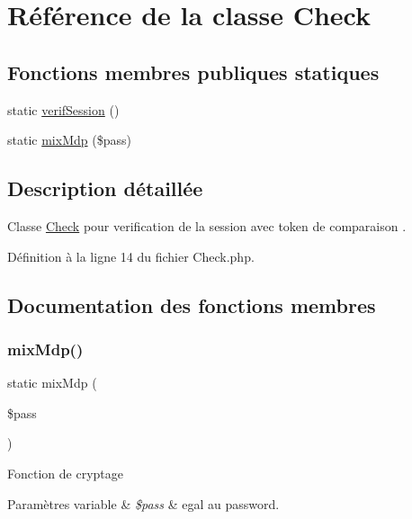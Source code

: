 \hypertarget{class_app_1_1_check}{}\section{Référence de la classe Check}
\label{class_app_1_1_check}
\subsection*{Fonctions membres publiques statiques}
\begin{DoxyCompactItemize}
\item 
static \hyperlink{class_app_1_1_check_a762802022c6341f5a11a5bd2d24e374a}{verif\+Session} ()
\item 
static \hyperlink{class_app_1_1_check_a336fdbb25ca75f575c65d04924058db9}{mix\+Mdp} (\$pass)
\end{DoxyCompactItemize}


\subsection{Description détaillée}
Classe \hyperlink{class_app_1_1_check}{Check} pour verification de la session avec token de comparaison . 

Définition à la ligne 14 du fichier Check.\+php.



\subsection{Documentation des fonctions membres}
\mbox{\label{class_app_1_1_check_a336fdbb25ca75f575c65d04924058db9}} 
\subsubsection{\texorpdfstring{mix\+Mdp()}{mixMdp()}}
{\footnotesize\ttfamily static mix\+Mdp (\begin{DoxyParamCaption}\item[{}]{\$pass }\end{DoxyParamCaption})\hspace{0.3cm}{\ttfamily [static]}}

Fonction de cryptage 
\begin{DoxyParams}[1]{Paramètres}
variable & {\em \$pass} & egal au password. \\
\hline
\end{DoxyParams}


